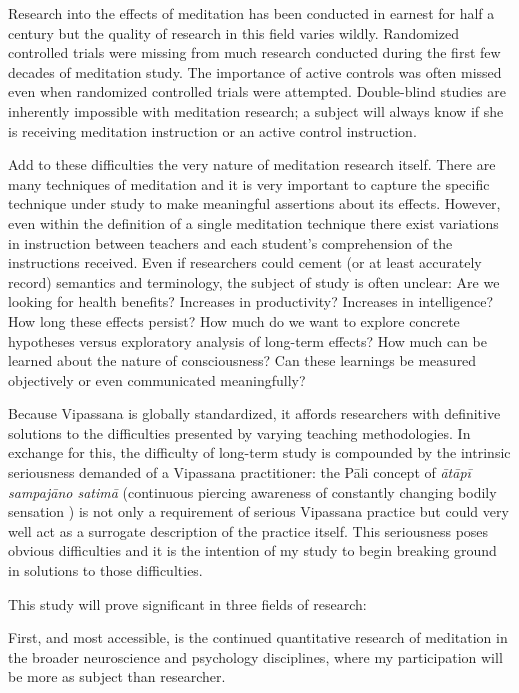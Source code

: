 \documentclass[a4paper, amsfonts, amssymb, amsmath, reprint, showkeys, nofootinbib, twoside]{revtex4-1}
\begin{document}
Research into the effects of meditation has been conducted in earnest for half a
century but the quality of research in this field varies wildly. Randomized
controlled trials were missing from much research conducted during the first few
decades of meditation study. The importance of active controls was often missed even
when randomized controlled trials were attempted. Double-blind studies are inherently
impossible with meditation research; a subject will always know if she is receiving
meditation instruction or an active control instruction. \cite{goleman2017altered}

Add to these difficulties the very nature of meditation research itself. There are
many techniques of meditation and it is very important to capture the specific
technique under study to make meaningful assertions about its
effects. \cite{goleman2017altered} However, even within the definition of a single
meditation technique there exist variations in instruction between
teachers and each student's comprehension of the instructions
received. \cite{davidson2015conceptual} Even if researchers could cement (or at least
accurately record) semantics and terminology, the subject of study is often unclear:
Are we looking for health benefits? Increases in productivity? Increases in
intelligence? How long these effects persist? How much do we want to explore concrete
hypotheses versus exploratory analysis of long-term effects? How much can be learned
about the nature of consciousness? Can these learnings be measured objectively or
even communicated meaningfully?

Because Vipassana is globally standardized, it affords researchers with definitive
solutions to the difficulties presented by varying teaching methodologies. In
exchange for this, the difficulty of long-term study is compounded by the intrinsic
seriousness demanded of a Vipassana practitioner: the Pāli concept of \textit{ātāpī
  sampajāno satimā} (continuous piercing awareness of constantly
changing bodily sensation \cite{goenka1999discourses}) is not only a
requirement of serious Vipassana practice but could very well act as a surrogate
description of the practice itself. This seriousness poses obvious difficulties and
it is the intention of my study to begin breaking ground in solutions to those
difficulties.

This study will prove significant in three fields of research:

First, and most accessible, is the continued quantitative research of meditation in
the broader neuroscience and psychology disciplines, where my participation will be
more as subject than researcher.
\end{document}
